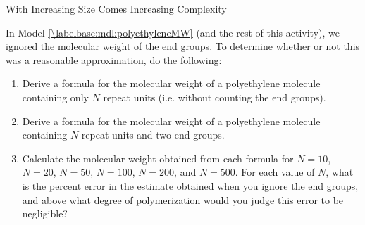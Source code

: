 \begin{activity}{With Increasing Size Comes Increasing Complexity}
\begin{exercises}

	\exercise In Model \ref{\labelbase:mdl:polyethyleneMW} (and the rest of this activity), we ignored the molecular weight of the end groups.  To determine whether or not this was a reasonable approximation, do the following:
	
		\begin{enumerate}
			
			\item Derive a formula for the molecular weight of a polyethylene molecule containing only $N$  repeat units (i.e. without counting the end groups).
			
				\begin{solution}\end{solution}
			
			\item Derive a formula for the molecular weight of a polyethylene molecule containing $N$  repeat units and two  end groups.
			
				\begin{solution}\end{solution}
			
			\item Calculate the molecular weight obtained from each formula for $N=10$, $N=20$, $N=50$, $N=100$, $N=200$, and $N=500$. For each value of $N$, what is the percent error in the estimate obtained when you ignore the end groups, and above what degree of polymerization would you judge this error to be negligible?
			
				\begin{solution}
\end{solution}
\end{enumerate}
\end{exercises}
\end{activity}
